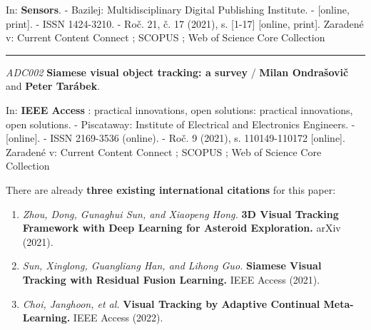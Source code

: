 \noindent In: \textbf{Sensors}. - Bazilej: Multidisciplinary Digital Publishing Institute. - [online, print]. - ISSN 1424-3210. - Roč. 21, č. 17 (2021), s. [1-17] [online, print].
Zaradené v: Current Content Connect ; SCOPUS ; Web of Science Core Collection


\noindent\rule{\textwidth}{0.4pt}

\noindent \textit{ADC002} \textbf{Siamese visual object tracking: a survey} / \textbf{Milan Ondrašovič} and \textbf{Peter Tarábek}.

\noindent In: \textbf{IEEE Access} : practical innovations, open solutions: practical innovations, open solutions. - Piscataway: Institute of Electrical and Electronics Engineers. - [online]. - ISSN 2169-3536 (online). - Roč. 9 (2021), s. 110149-110172 [online].
Zaradené v: Current Content Connect ; SCOPUS ; Web of Science Core Collection


There are already \textbf{three existing international citations} for this paper:
\begin{enumerate}
    \item \textit{Zhou, Dong, Gunaghui Sun, and Xiaopeng Hong.} \textbf{3D Visual Tracking Framework with Deep Learning for Asteroid Exploration.} arXiv (2021).
    \item \textit{Sun, Xinglong, Guangliang Han, and Lihong Guo.} \textbf{Siamese Visual Tracking with Residual Fusion Learning.} IEEE Access (2021).
    \item \textit{Choi, Janghoon, et al.} \textbf{Visual Tracking by Adaptive Continual Meta-Learning.} IEEE Access (2022).
\end{enumerate}
